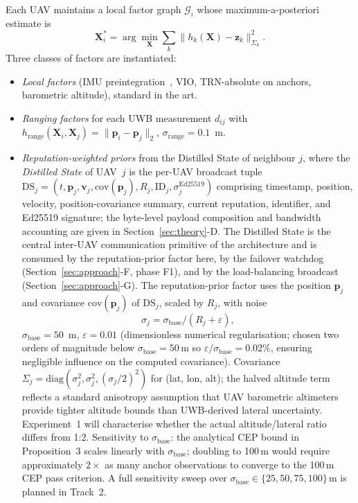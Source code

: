 \documentclass[conference,10pt]{IEEEtran}
\begin{document}
Each UAV maintains a local factor graph $\mathcal{G}_i$ whose maximum-a-posteriori estimate is
\begin{equation}
\mathbf{X}_i^* = \arg\min_{\mathbf{X}} \sum_k \lVert h_k(\mathbf{X}) - \mathbf{z}_k \rVert^2_{\Sigma_k}.
\end{equation}
Three classes of factors are instantiated:
\begin{itemize}
    \item \emph{Local factors} (IMU preintegration~\cite{forster2017preintegration}, VIO, TRN-absolute on anchors, barometric altitude), standard in the art.
    \item \emph{Ranging factors} for each UWB measurement $d_{ij}$ with $h_\text{range}(\mathbf{X}_i, \mathbf{X}_j) = \lVert \mathbf{p}_i - \mathbf{p}_j \rVert_2$, $\sigma_\text{range} = 0.1$~m.
    \item \emph{Reputation-weighted priors} from the Distilled State of neighbour $j$, where the \emph{Distilled State} of UAV~$j$ is the per-UAV broadcast tuple $\mathrm{DS}_j = (t, \mathbf{p}_j, \mathbf{v}_j, \mathrm{cov}(\mathbf{p}_j), R_j, \mathrm{ID}_j, \sigma_j^{\mathrm{Ed25519}})$ comprising timestamp, position, velocity, position-covariance summary, current reputation, identifier, and Ed25519 signature; the byte-level payload composition and bandwidth accounting are given in Section~\ref{sec:theory}-D. The Distilled State is the central inter-UAV communication primitive of the architecture and is consumed by the reputation-prior factor here, by the failover watchdog (Section~\ref{sec:approach}-F, phase F1), and by the load-balancing broadcast (Section~\ref{sec:approach}-G). The reputation-prior factor uses the position $\mathbf{p}_j$ and covariance $\mathrm{cov}(\mathbf{p}_j)$ of $\mathrm{DS}_j$, scaled by $R_j$, with noise
    \begin{equation}
    \sigma_j = \sigma_\text{base} / (R_j + \varepsilon),
    \label{eq:noise_rep}
    \end{equation}
    $\sigma_\text{base} = 50$~m, $\varepsilon = 0.01$ (dimensionless numerical regularisation; chosen two orders of magnitude below $\sigma_\text{base}=50$\,m so $\varepsilon/\sigma_\text{base}=0.02\%$, ensuring negligible influence on the computed covariance). Covariance $\Sigma_j = \mathrm{diag}(\sigma_j^2, \sigma_j^2, (\sigma_j/2)^2)$ for (lat, lon, alt); the halved altitude term reflects a standard anisotropy assumption that UAV barometric altimeters provide tighter altitude bounds than UWB-derived lateral uncertainty. Experiment~1 will characterise whether the actual altitude/lateral ratio differs from 1:2. Sensitivity to $\sigma_\text{base}$: the analytical CEP bound in Proposition~3 scales linearly with $\sigma_\text{base}$; doubling to 100\,m would require approximately $2\times$ as many anchor observations to converge to the 100\,m CEP pass criterion. A full sensitivity sweep over $\sigma_\text{base} \in \{25, 50, 75, 100\}$\,m is planned in Track~2.
\end{itemize}
\end{document}
